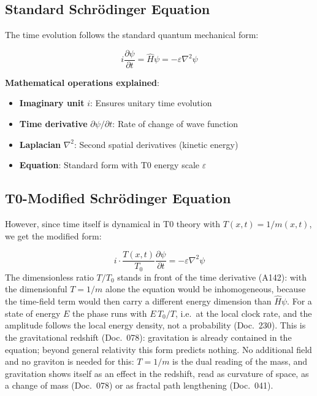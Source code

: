 	\subsection{Standard Schrödinger Equation}
	
	The time evolution follows the standard quantum mechanical form:
	
	\begin{equation}
		i\frac{\partial\psi}{\partial t} = \hat{H}\psi = -\varepsilon \nabla^2 \psi
		\label{eq:standard_schrodinger_t0}
	\end{equation}
	
	\textbf{Mathematical operations explained}:
	\begin{itemize}
		\item \textbf{Imaginary unit} $i$: Ensures unitary time evolution
		\item \textbf{Time derivative} $\partial\psi/\partial t$: Rate of change of wave function
		\item \textbf{Laplacian} $\nabla^2$: Second spatial derivatives (kinetic energy)
		\item \textbf{Equation}: Standard form with T0 energy scale $\varepsilon$
	\end{itemize}
	
	\subsection{T0-Modified Schrödinger Equation}
	
	However, since time itself is dynamical in T0 theory with $T(x,t) = 1/m(x,t)$, we get the modified form:
	
	\begin{equation}
		\boxed{i \cdot \frac{T(x,t)}{T_0} \frac{\partial\psi}{\partial t} = -\varepsilon \nabla^2 \psi}
		\label{eq:t0_modified_schrodinger}
	\end{equation}
	The dimensionless ratio $T/T_0$ stands in front of the time derivative (A142): with the dimensionful $T=1/m$ alone the equation would be inhomogeneous, because the time-field term would then carry a different energy dimension than $\hat H\psi$. For a state of energy $E$ the phase runs with $E\,T_0/T$, i.e.\ at the local clock rate, and the amplitude follows the local energy density, not a probability (Doc.~230). This is the gravitational redshift (Doc.~078): gravitation is already contained in the equation; beyond general relativity this form predicts nothing. No additional field and no graviton is needed for this: $T=1/m$ is the dual reading of the mass, and gravitation shows itself as an effect in the redshift, read as curvature of space, as a change of mass (Doc.~078) or as fractal path lengthening (Doc.~041).
	
